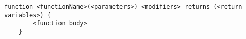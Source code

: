 \begin{lstlisting}[language=Solidity]
	function <functionName>(<parameters>) <modifiers> returns (<return variables>) {
		<function body>
	}
\end{lstlisting}